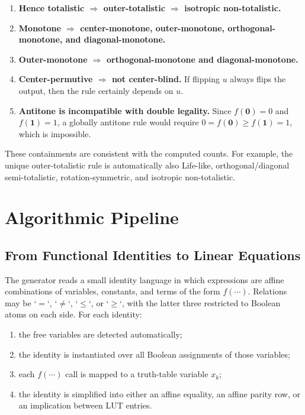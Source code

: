 \documentclass[11pt,a4paper]{article}
\begin{document}
\begin{enumerate}
\item \textbf{Hence totalistic \(\Rightarrow\) outer-totalistic \(\Rightarrow\) isotropic non-totalistic.}
\item \textbf{Monotone \(\Rightarrow\) center-monotone, outer-monotone, orthogonal-monotone, and diagonal-monotone.}
\item \textbf{Outer-monotone \(\Rightarrow\) orthogonal-monotone and diagonal-monotone.}
\item \textbf{Center-permutive \(\Rightarrow\) not center-blind.}
      If flipping \(u\) always flips the output, then the rule certainly depends on \(u\).
\item \textbf{Antitone is incompatible with double legality.}
      Since \(f(\mathbf{0})=0\) and \(f(\mathbf{1})=1\), a globally antitone rule would require
      \(0=f(\mathbf{0}) \ge f(\mathbf{1})=1\), which is impossible.
\end{enumerate}

These containments are consistent with the computed counts.  For example, the unique
outer-totalistic rule is automatically also Life-like, orthogonal/diagonal semi-totalistic,
rotation-symmetric, and isotropic non-totalistic.

\section{Algorithmic Pipeline}

\subsection{From Functional Identities to Linear Equations}

The generator reads a small identity language in which expressions are affine combinations of
variables, constants, and terms of the form \(f(\cdots)\).  Relations may be `\(=\)`, `\(\neq\)`,
`\(\le\)`, or `\(\ge\)`, with the latter three restricted to Boolean atoms on each side.  For each identity:
\begin{enumerate}
\item the free variables are detected automatically;
\item the identity is instantiated over all Boolean assignments of those variables;
\item each \(f(\cdots)\) call is mapped to a truth-table variable \(x_k\);
\item the identity is simplified into either an affine equality, an affine parity row, or an implication between LUT entries.
\end{enumerate}
\end{document}

